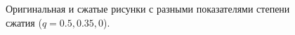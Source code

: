 \documentclass[12pt,a4paper]{article}
\begin{document}
\begin{figure}[!htb]
                \hspace{8pt}%
                \hspace{8pt}%
                \caption[]{Оригинальная и сжатые рисунки с разными показателями степени сжатия ($q=0.5,0.35,0$).}%
                \label{fig:2}%
            \end{figure}
\end{document}
